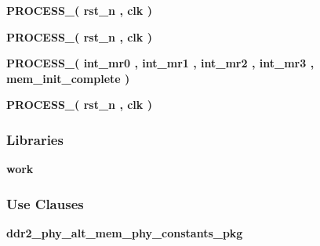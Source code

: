 \begin{DoxyCompactItemize}
\item 
{\bf P\+R\+O\+C\+E\+S\+S\+\_}{\bfseries  ( {\bfseries {\bfseries {\bf rst\+\_\+n}} \textcolor{vhdlchar}{ }} , {\bfseries {\bfseries {\bf clk}} \textcolor{vhdlchar}{ }} )}
\item 
{\bf P\+R\+O\+C\+E\+S\+S\+\_}{\bfseries  ( {\bfseries {\bfseries {\bf rst\+\_\+n}} \textcolor{vhdlchar}{ }} , {\bfseries {\bfseries {\bf clk}} \textcolor{vhdlchar}{ }} )}
\item 
{\bf P\+R\+O\+C\+E\+S\+S\+\_}{\bfseries  ( {\bfseries {\bfseries {\bf int\+\_\+mr0}} \textcolor{vhdlchar}{ }} , {\bfseries {\bfseries {\bf int\+\_\+mr1}} \textcolor{vhdlchar}{ }} , {\bfseries {\bfseries {\bf int\+\_\+mr2}} \textcolor{vhdlchar}{ }} , {\bfseries {\bfseries {\bf int\+\_\+mr3}} \textcolor{vhdlchar}{ }} , {\bfseries {\bfseries {\bf mem\+\_\+init\+\_\+complete}} \textcolor{vhdlchar}{ }} )}
\item 
{\bf P\+R\+O\+C\+E\+S\+S\+\_}{\bfseries  ( {\bfseries {\bfseries {\bf rst\+\_\+n}} \textcolor{vhdlchar}{ }} , {\bfseries {\bfseries {\bf clk}} \textcolor{vhdlchar}{ }} )}
\end{DoxyCompactItemize}
\subsubsection*{Libraries}
 \begin{DoxyCompactItemize}
\item 
{\bf work} 
\end{DoxyCompactItemize}
\subsubsection*{Use Clauses}
 \begin{DoxyCompactItemize}
\item 
{\bf ddr2\+\_\+phy\+\_\+alt\+\_\+mem\+\_\+phy\+\_\+constants\+\_\+pkg}   
\end{DoxyCompactItemize}
